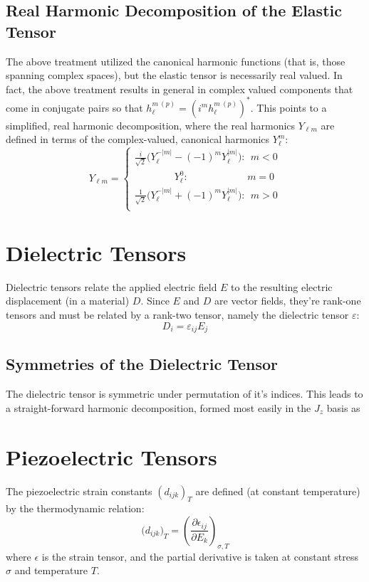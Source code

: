 \documentclass[10pt,a4paper]{article}
\begin{document}
\subsection{Real Harmonic Decomposition of the Elastic Tensor}
The above treatment utilized the canonical harmonic functions (that is, those spanning complex spaces), but the elastic tensor is necessarily real valued. In fact, the above treatment results in general in complex valued components that come in conjugate pairs so that $h_{\ell}^{m \ (p)}=(i^m h_{\ell}^{m \ (p)})^*$. This points to a simplified, real harmonic decomposition, where the real harmonics $Y_{\ell m}$ are defined in terms of the complex-valued, canonical harmonics $Y_{\ell}^m$:
$$
Y_{\ell m }=
\begin{cases}
\frac{i}{\sqrt{2}}\big(Y_{\ell}^{-|m|} - (-1)^m Y_{\ell}^{|m|} \big):\ \ m<0\\
\quad\quad\quad\quad Y_{\ell}^0:\quad\quad\quad\quad\quad\ \ \  \ m=0\\
\frac{1}{\sqrt{2}}\big(Y_{\ell}^{-|m|} + (-1)^m Y_{\ell}^{|m|} \big):\ \ m>0\\
\end{cases}
$$



\section{Dielectric Tensors}

Dielectric tensors relate the applied electric field $E$ to the resulting electric displacement (in a material) $D$. Since $E$ and $D$ are vector fields, they're rank-one tensors and must be related by a rank-two tensor, namely the dielectric tensor $\varepsilon$:
$$
D_i=\varepsilon_{ij}E_j
$$
\subsection{Symmetries of the Dielectric Tensor}
The dielectric tensor is symmetric under permutation of it's indices. This leads to a straight-forward harmonic decomposition, formed most easily in the $J_z$ basis as

\section{Piezoelectric Tensors}
The piezoelectric strain constants $(d_{ijk})_{T}$ are defined (at constant temperature) by the thermodynamic relation:
$$
\big(d_{ijk}\big)_{T}=\left(\frac{\partial \epsilon_{ij}}{\partial E_k} \right)_{\sigma, T}
$$
where $\epsilon$ is the strain tensor, and the partial derivative is taken at constant stress $\sigma$ and temperature $T$.
\end{document}
